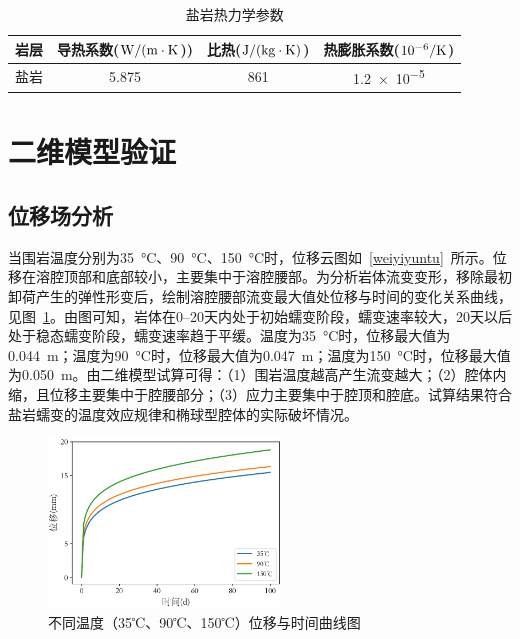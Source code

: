 \begin{table}[ht!]\small
    \centering
    \begin{tabularx}{\textwidth}{C{0.5}C{1.5}C{1.0}C{1.0}}
        \toprule
        岩层 & 导热系数($\rm{W/(m \cdot K}$)) & 比热($\rm{J/(kg\cdot K)}$) & {热膨胀系数($\rm{10^{-6}/K}$)}  \\
        \midrule
        盐岩 & 5.875         & 861                           & \num{1.2e-5} \\ \bottomrule
    \end{tabularx}
    \caption{盐岩热力学参数}%
    \label{tab:3} 
\end{table}

\section{二维模型验证}

\subsection{位移场分析}

当围岩温度分别为\SI{35}{\celsius}、\SI{90}{\celsius}、\SI{150}{\celsius}时，位移云图如~\ref{weiyiyuntu}~所示。位移在溶腔顶部和底部较小，主要集中于溶腔腰部。为分析岩体流变变形，移除最初卸荷产生的弹性形变后，绘制溶腔腰部流变最大值处位移与时间的变化关系曲线，见图~\ref{dispalment-t}。由图可知，岩体在\numrange{0}{20}天内处于初始蠕变阶段，蠕变速率较大，20天以后处于稳态蠕变阶段，蠕变速率趋于平缓。温度为\SI{35}{\celsius}时，位移最大值为\SI{0.044}{m}；温度为\SI{90}{\celsius}时，位移最大值为\SI{0.047}{m}；温度为\SI{150}{\celsius}时，位移最大值为\SI{0.050}{m}。由二维模型试算可得：（1）围岩温度越高产生流变越大；（2）腔体内缩，且位移主要集中于腔腰部分；（3）应力主要集中于腔顶和腔底。试算结果符合盐岩蠕变的温度效应规律和椭球型腔体的实际破坏情况。

\begin{figure}[ht!]
    \centering
    \includegraphics[width=0.55\textwidth]{img/chap4/不同温度（35℃、90℃、150℃）位移与时间曲线图.pdf}
    \caption{不同温度（35℃、90℃、150℃）位移与时间曲线图}
    \label{dispalment-t}
\end{figure}

